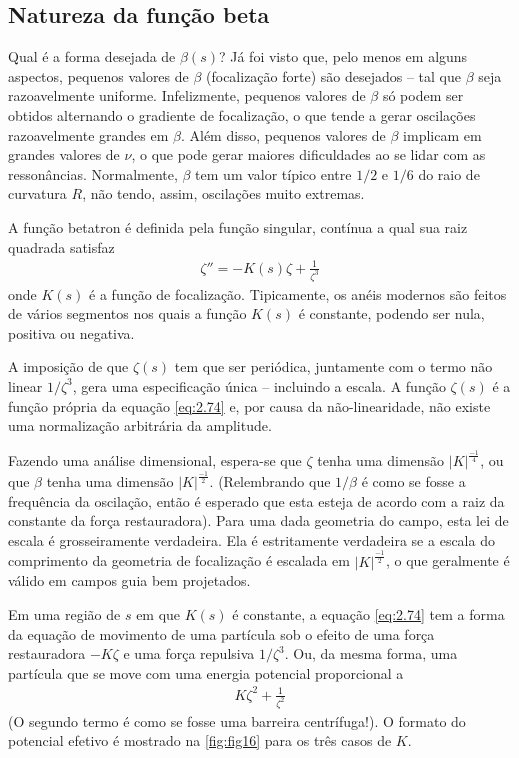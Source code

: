 \subsection{Natureza da função beta}\label{sec:2.9}
Qual é a forma desejada de $\beta(s)$? Já foi visto que, pelo menos em alguns aspectos, pequenos valores de $\beta$ (focalização forte) são desejados -- tal que $\beta$ seja razoavelmente uniforme. Infelizmente, pequenos valores de $\beta$ só podem ser obtidos alternando o gradiente de focalização, o que tende a gerar oscilações razoavelmente grandes em $\beta$. Além disso, pequenos valores de $\beta$ implicam em grandes valores de $\nu$, o que pode gerar maiores dificuldades ao se lidar com as ressonâncias. Normalmente, $\beta$ tem um valor típico entre $1/2$ e $1/6$ do raio de curvatura $R$, não tendo, assim, oscilações muito extremas.

A função betatron é definida pela função singular, contínua a qual sua raiz quadrada satisfaz
\begin{align}
	\zeta'' = -K(s)\zeta + \frac{1}{\zeta^3}\label{eq:2.74}
\end{align}
onde $K(s)$ é a função de focalização. Tipicamente, os anéis modernos são feitos de vários segmentos nos quais a função $K(s)$ é constante, podendo ser nula, positiva ou negativa.

A imposição de que $\zeta(s)$ tem que ser periódica, juntamente com o termo não linear $1/\zeta^3$, gera uma especificação única -- incluindo a escala. A função $\zeta(s)$ é a função própria da equação \eqref{eq:2.74} e, por causa da não-linearidade, não existe uma normalização arbitrária da amplitude.

Fazendo uma análise dimensional, espera-se que $\zeta$ tenha uma dimensão $|K|^\frac{-1}{4}$, ou que $\beta$ tenha uma dimensão $|K|^\frac{-1}{2}$. (Relembrando que $1/\beta$ é como se fosse a frequência da oscilação, então é esperado que esta esteja de acordo com a raiz da constante da força restauradora). Para uma dada geometria do campo, esta lei de escala é grosseiramente verdadeira. Ela é estritamente verdadeira se a escala do comprimento da geometria de focalização é escalada em $|K|^\frac{-1}{2}$, o que geralmente é válido em campos guia bem projetados.

Em uma região de $s$ em que $K(s)$ é constante, a equação \eqref{eq:2.74} tem a forma da equação de movimento de uma partícula sob o efeito de uma força restauradora $-K\zeta$ e uma força repulsiva $1/\zeta^3$. Ou, da mesma forma, uma partícula que se move com uma energia potencial proporcional a
\begin{align}
	K\zeta^2 + \frac{1}{\zeta^2}
\end{align}
(O segundo termo é como se fosse uma barreira centrífuga!). O formato do potencial efetivo é mostrado na \autoref{fig:fig16} para os três casos de $K$.


